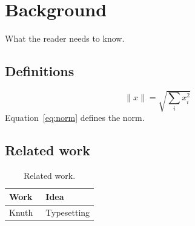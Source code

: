 \chapter{Background}\label{ch:background}

What the reader needs to know.

\section{Definitions}
\begin{equation}\label{eq:norm}
  \lVert x \rVert = \sqrt{\sum_i x_i^2}
\end{equation}
Equation~\eqref{eq:norm} defines the norm.

\section{Related work}
\begin{table}[htbp]
  \centering
  \caption{Related work.}
  \label{tab:related}
  \begin{tabular}{ll}
    \toprule
    Work & Idea \\
    \midrule
    Knuth~\cite{knuth84} & Typesetting \\
    \bottomrule
  \end{tabular}
\end{table}
